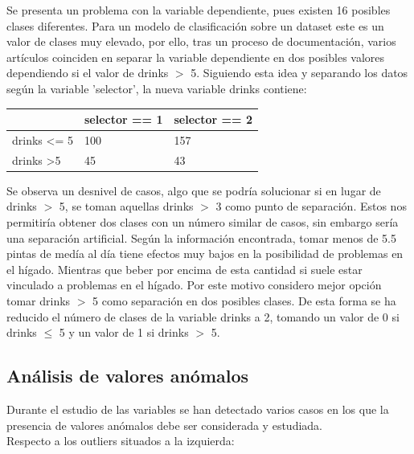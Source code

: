 Se presenta un problema con la variable dependiente, pues existen 16 posibles clases diferentes. Para un modelo de clasificación sobre un dataset este es un valor de clases muy elevado, por ello, tras un proceso de documentación, varios artículos coinciden en separar la variable dependiente en dos posibles valores dependiendo si el valor de drinks $ > $  5. \cite{1}
Siguiendo esta idea y separando los datos según la variable 'selector', la nueva variable drinks contiene:
\begin{table}[h!]
	\centering
	\begin{tabular}{l|ll}
		& selector == 1 & selector == 2 \\ \hline
		drinks \textless{}= 5 & 100           & 157           \\
		drinks \textgreater 5 & 45            & 43           
	\end{tabular}
\end{table}

Se observa un desnivel de casos, algo que se podría solucionar si en lugar de drinks $ > $ 5, se toman aquellas drinks $ > $  3 como punto de separación. Estos nos permitiría obtener dos clases con un número similar de casos, sin embargo sería una separación artificial. Según la información encontrada, tomar menos de 5.5 pintas de medía al día tiene efectos muy bajos en la posibilidad de problemas en el hígado. Mientras que beber por encima de esta cantidad si suele estar vinculado a problemas en el hígado. \cite{2}
Por este motivo considero mejor opción tomar drinks $ > $  5 como separación en dos posibles clases. De esta forma se ha reducido el número de clases de la variable drinks a 2, tomando un valor de 0 si drinks $ \leq $ 5 y un valor de 1 si drinks $ > $ 5.




\vspace{1cm}
\subsection{Análisis de valores anómalos}
Durante el estudio de las variables se han detectado varios casos en los que la presencia de valores anómalos debe ser considerada y estudiada. \\


Respecto a los outliers situados a la izquierda:


